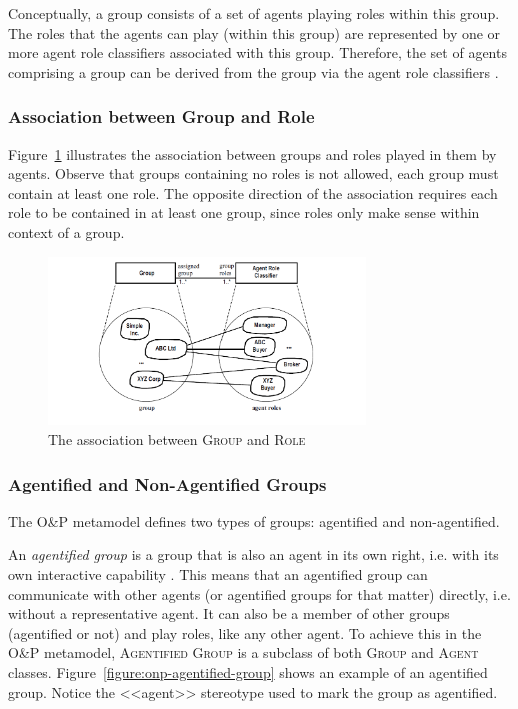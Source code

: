 Conceptually, a group consists of a set of agents playing roles within this group.
The roles that the agents can play (within this group) are represented by one or more agent role classifiers associated with this group.
Therefore, the set of agents comprising a group can be derived from the group via the agent role classifiers \cite{Odell05}.

\subsubsection*{Association between Group and Role}

Figure~\ref{figure:onp-group-role-association} illustrates the association between groups and roles played in them by agents.
Observe that groups containing no roles is not allowed, each group must contain at least one role.
The opposite direction of the association requires each role to be contained in at least one group, since roles only make sense within context of a group.

\begin{figure}[ht]
	\centering
	\includegraphics[width=0.75\textwidth]{images/onp/group-role-association.png}
	\caption{The association between \textsc{Group} and \textsc{Role}}
	\label{figure:onp-group-role-association}
\end{figure}

\subsubsection*{Agentified and Non-Agentified Groups}

The O\&P metamodel defines two types of groups: agentified and non-agentified.

An \textit{agentified group} is a group that is also an agent in its own right, i.e. with its own interactive capability \cite{Odell05}.
This means that an agentified group can communicate with other agents (or agentified groups for that matter) directly, i.e. without a representative agent.
It can also be a member of other groups (agentified or not) and play roles, like any other agent.
To achieve this in the O\&P metamodel, \textsc{Agentified Group} is a subclass of both \textsc{Group} and \textsc{Agent} classes.
Figure~\ref{figure:onp-agentified-group} shows an example of an agentified group.
Notice the <<agent>> stereotype used to mark the group as agentified.

